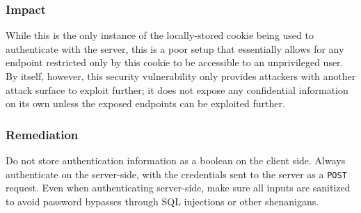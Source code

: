 \documentclass[12pt, letterpaper]{article}
\begin{document}
\subsubsection*{Impact}

While this is the only instance of the locally-stored cookie being
used to authenticate with the server, this is a poor setup that
essentially allows for any endpoint restricted only by this cookie to
be accessible to an unprivileged user. By itself, however, this
security vulnerability only provides attackers with another attack
surface to exploit further; it does not expose any confidential
information on its own unless the exposed endpoints can be exploited further.

\subsubsection*{Remediation}

Do not store authentication information as a boolean on the client
side. Always authenticate on the server-side, with the credentials
sent to the server as a \texttt{POST} request. Even when
authenticating server-side, make sure all inputs are sanitized to
avoid password bypasses through SQL injections or other shenanigans.
\end{document}
